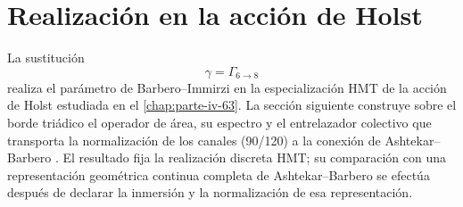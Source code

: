 \section{Realización en la acción de Holst}

La sustitución
\[
 \gamma=\Gamma_{6\to8}
\]
realiza el parámetro de Barbero--Immirzi en la especialización HMT de la
acción de Holst estudiada en el \cref{chap:parte-iv-63}. La sección siguiente
construye sobre el borde triádico el operador de área, su espectro y el
entrelazador colectivo que transporta la normalización de los canales
(90/120) a la conexión de Ashtekar--Barbero
\cite{Barbero1995,Immirzi1997,Holst1996}. El resultado fija la realización
discreta HMT; su comparación con una representación geométrica continua
completa de Ashtekar--Barbero se efectúa después de declarar la inmersión y
la normalización de esa representación.
